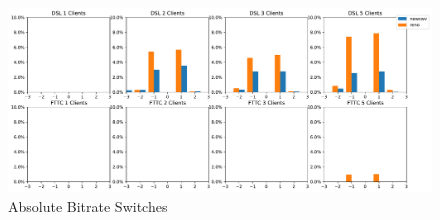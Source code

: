 \documentclass[10pt,sigconf,anonymous]{acmart}
\begin{document}
\begin{figure}
  \centering
  \includegraphics[width=\textwidth, keepaspectratio]{figures/bitrate_derivative_distribution.pdf}
  \caption{Absolute Bitrate Switches}
  \label{fig:bitrate-switches}
\end{figure}






\end{document}
